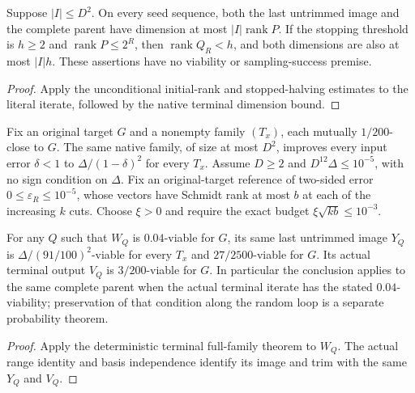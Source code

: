 \begin{lemma}
    \label{lem:canonical_half_sampling_parent_dimensions}
    \leanok
    Suppose $|I|\le D^2$. On every seed sequence, both the last untrimmed
    image and the complete parent have dimension at most
    $|I|\operatorname{rank}P$.
    If the stopping threshold is $h\ge2$ and
    $\operatorname{rank}P\le2^R$, then
    $\operatorname{rank}Q_R<h$, and both dimensions are also at most $|I|h$.
    These assertions have no viability or sampling-success premise.
\end{lemma}
\begin{proof}\leanok
    Apply the unconditional initial-rank and stopped-halving estimates to
    the literal iterate, followed by the native terminal dimension bound.
\end{proof}

\begin{theorem}
    \label{thm:native_family_terminal_improvement}
    \leanok
    Fix an original target $G$ and a nonempty family $(T_x)$, each mutually
    $1/200$-close to $G$. The same native family, of size at most
    $D^2$, improves every input error $\delta<1$ to
    $\Delta/(1-\delta)^2$ for every $T_x$. Assume $D\ge2$ and
    $D^{12}\Delta\le10^{-5}$, with no sign condition on $\Delta$.
    Fix an original-target reference of two-sided error
    $0\le\varepsilon_R\le10^{-5}$, whose vectors have Schmidt rank at most
    $b$ at each of the increasing $k$ cuts. Choose $\xi>0$ and require the
    exact budget $\xi\sqrt{kb}\le10^{-3}$.

    For any $Q$ such that $W_Q$ is $0.04$-viable for $G$, its same last
    untrimmed image $Y_Q$ is $\Delta/(91/100)^2$-viable for every $T_x$
    and $27/2500$-viable for $G$. Its actual terminal output $V_Q$ is
    $3/200$-viable for $G$. In particular the conclusion applies to the
    same complete parent when the actual terminal iterate has the stated
    $0.04$-viability; preservation of that condition along the random loop
    is a separate probability theorem.
\end{theorem}
\begin{proof}\leanok
    Apply the deterministic terminal full-family theorem to $W_Q$. The
    actual range identity and basis independence identify its image and
    trim with the same $Y_Q$ and $V_Q$.
\end{proof}

